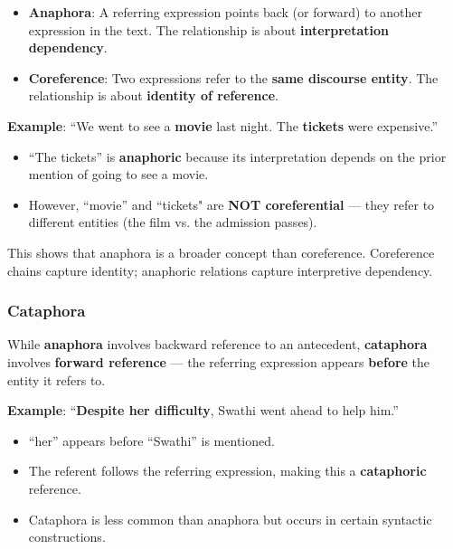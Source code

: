 \documentclass[11pt,a4paper]{article}
\begin{document}
\begin{itemize}
    \item \textbf{Anaphora}: A referring expression points back (or forward) to another expression in the text. The relationship is about \textbf{interpretation dependency}.
    \item \textbf{Coreference}: Two expressions refer to the \textbf{same discourse entity}. The relationship is about \textbf{identity of reference}.
\end{itemize}

\begin{tcolorbox}[colback=yellow!5!white,colframe=yellow!75!black,title=\textbf{Key Distinction: Anaphoric but Not Coreferential}]
\textbf{Example}: ``We went to see a \textbf{movie} last night. The \textbf{tickets} were expensive.''

\begin{itemize}
    \item ``The tickets'' is \textbf{anaphoric} because its interpretation depends on the prior mention of going to see a movie.
    \item However, ``movie'' and ``tickets" are \textbf{NOT coreferential} --- they refer to different entities (the film vs. the admission passes).
\end{itemize}

This shows that anaphora is a broader concept than coreference. Coreference chains capture identity; anaphoric relations capture interpretive dependency.
\end{tcolorbox}

\subsubsection{Cataphora}

While \textbf{anaphora} involves backward reference to an antecedent, \textbf{cataphora} involves \textbf{forward reference} --- the referring expression appears \textbf{before} the entity it refers to.

\begin{tcolorbox}[colback=green!5!white,colframe=green!75!black,title=\textbf{Example: Cataphora}]
\textbf{Example}: ``\textbf{Despite her difficulty}, Swathi went ahead to help him.''

\begin{itemize}
    \item ``her'' appears before ``Swathi'' is mentioned.
    \item The referent follows the referring expression, making this a \textbf{cataphoric} reference.
    \item Cataphora is less common than anaphora but occurs in certain syntactic constructions.
\end{itemize}
\end{tcolorbox}
\end{document}
